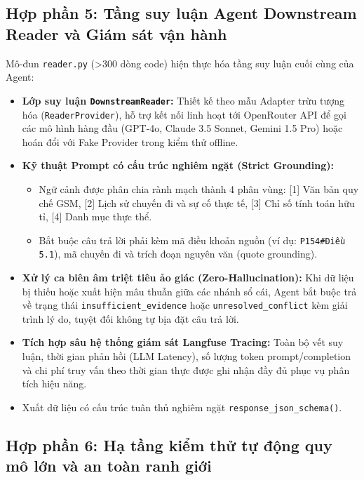 \documentclass[a4paper,11pt]{article}
\begin{document}
\subsection{Hợp phần 5: Tầng suy luận Agent Downstream Reader và Giám sát vận hành}
\label{sec:agent-reader}

Mô-đun \nolinkurl{reader.py} (>300 dòng code) hiện thực hóa tầng suy luận cuối cùng của Agent:
\begin{itemize}[leftmargin=1.5em]
    \item \textbf{Lớp suy luận \nolinkurl{DownstreamReader}:} Thiết kế theo mẫu Adapter trừu tượng hóa (\nolinkurl{ReaderProvider}), hỗ trợ kết nối linh hoạt tới OpenRouter API để gọi các mô hình hàng đầu (GPT-4o, Claude 3.5 Sonnet, Gemini 1.5 Pro) hoặc hoán đổi với Fake Provider trong kiểm thử offline.
    \item \textbf{Kỹ thuật Prompt có cấu trúc nghiêm ngặt (Strict Grounding):}
    \begin{itemize}[noitemsep]
        \item Ngữ cảnh được phân chia rành mạch thành 4 phân vùng: [1] Văn bản quy chế GSM, [2] Lịch sử chuyến đi và sự cố thực tế, [3] Chỉ số tính toán hữu tỉ, [4] Danh mục thực thể.
        \item Bắt buộc câu trả lời phải kèm mã điều khoản nguồn (ví dụ: \texttt{P154\#Điều 5.1}), mã chuyến đi và trích đoạn nguyên văn (quote grounding).
    \end{itemize}
    \item \textbf{Xử lý ca biên âm triệt tiêu ảo giác (Zero-Hallucination):}
    Khi dữ liệu bị thiếu hoặc xuất hiện mâu thuẫn giữa các nhánh sổ cái, Agent bắt buộc trả về trạng thái \nolinkurl{insufficient_evidence} hoặc \nolinkurl{unresolved_conflict} kèm giải trình lý do, tuyệt đối không tự bịa đặt câu trả lời.
    \item \textbf{Tích hợp sâu hệ thống giám sát Langfuse Tracing:}
    Toàn bộ vết suy luận, thời gian phản hồi (LLM Latency), số lượng token prompt/completion và chi phí truy vấn theo thời gian thực được ghi nhận đầy đủ phục vụ phân tích hiệu năng.
    \item Xuất dữ liệu có cấu trúc tuân thủ nghiêm ngặt \texttt{response\_json\_schema()}.
\end{itemize}

\subsection{Hợp phần 6: Hạ tầng kiểm thử tự động quy mô lớn và an toàn ranh giới}
\label{sec:testing-infra}
\end{document}
